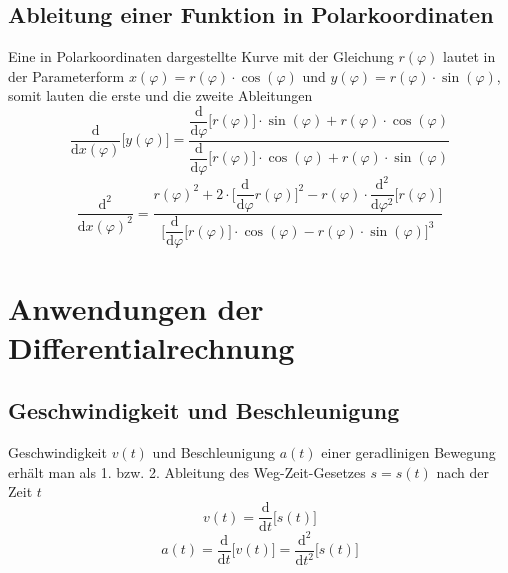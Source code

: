 \subsection{Ableitung einer Funktion in Polarkoordinaten}
Eine in Polarkoordinaten dargestellte Kurve mit der Gleichung $r\left(\varphi\right)$ lautet in der Parameterform
$x\left(\varphi\right)=r\left(\varphi\right)\cdot \cos\left(\varphi\right)$ und $y\left(\varphi\right)=r\left(\varphi\right)\cdot \sin\left(\varphi\right)$, somit lauten die erste und die zweite Ableitungen
\begin{equation}
\boxed{\dfrac{\text{d}}{\text{d}x\left(\varphi\right)}\Big[y\left(\varphi\right)\Big]=\dfrac{\dfrac{\text{d}}{\text{d}\varphi}\Big[r\left(\varphi\right)\Big]\cdot \sin\left(\varphi\right)+r\left(\varphi\right)\cdot \cos\left(\varphi\right)}{\dfrac{\text{d}}{\text{d}\varphi}\Big[r\left(\varphi\right)\Big]\cdot \cos\left(\varphi\right)+r\left(\varphi\right)\cdot \sin\left(\varphi\right)}}
\end{equation}
\begin{equation}
\boxed{\dfrac{\text{d}^2}{\text{d}x\left(\varphi\right)^2}=\dfrac{r\left(\varphi\right)^2+2\cdot \Big[\dfrac{\text{d}}{\text{d}\varphi}r\left(\varphi\right)\Big]^2-r\left(\varphi\right)\cdot \dfrac{\text{d}^2}{\text{d}\varphi^2}\Big[r\left(\varphi\right)\Big]}{\Big[\dfrac{\text{d}}{\text{d}\varphi}\Big[r\left(\varphi\right)\Big]\cdot \cos\left(\varphi\right)-r\left(\varphi\right)\cdot \sin\left(\varphi\right)\Big]^3}}
\end{equation}
\section{Anwendungen der Differentialrechnung}
\subsection{Geschwindigkeit und Beschleunigung}
Geschwindigkeit $v\left(t\right)$ und Beschleunigung $a\left(t\right)$ einer geradlinigen Bewegung erhält man als 1. bzw. 2. Ableitung des Weg-Zeit-Gesetzes $s=s\left(t\right)$ nach der Zeit $t$
\begin{equation}
\boxed{v\left(t\right)=\dfrac{\text{d}}{\text{d}t}\Big[s\left(t\right)\Big]}
\end{equation}
\begin{equation}
\boxed{a\left(t\right)=\dfrac{\text{d}}{\text{d}t}\Big[v\left(t\right)\Big]=\dfrac{\text{d}^2}{\text{d}t^2}\Big[s\left(t\right)\Big]}
\end{equation}
